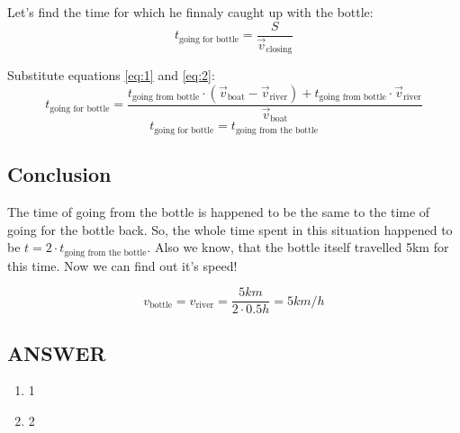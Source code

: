 Let's find the time for which he finnaly caught up with the bottle:
\begin{equation}
    \label{eq:3}
    t_{\text{going for bottle}} = \frac{S}{\Vec{v}_\text{closing}}
\end{equation}

Substitute equations \eqref{eq:1} and \eqref{eq:2}:
$$t_{\text{going for bottle}} = \frac{t_{\text{going from bottle}} \cdot (\Vec{v}_{\text{boat}} - \Vec{v}_{\text{river}}) + t_{\text{going from bottle}} \cdot \Vec{v}_{\text{river}}}{\Vec{v}_{\text{boat}}}$$ 
$$ t_{\text{going for bottle}} = t_\text{going from the bottle} $$

\subsection*{Conclusion}
The time of going from the bottle is happened to be the same to the time of going for the bottle back.
So, the whole time spent in this situation happened to be $t = 2 \cdot t_\text{going from the bottle}$. Also we know, that the bottle itself travelled 5km for this time.
Now we can find out it's speed! 

$$v_\text{bottle} = v_\text{river} = \frac{5km}{2 \cdot 0.5h} = 5km/h$$



\vfill
\subsection*{ANSWER}
\begin{enumerate}
    \item 1
    \item 2
\end{enumerate}

